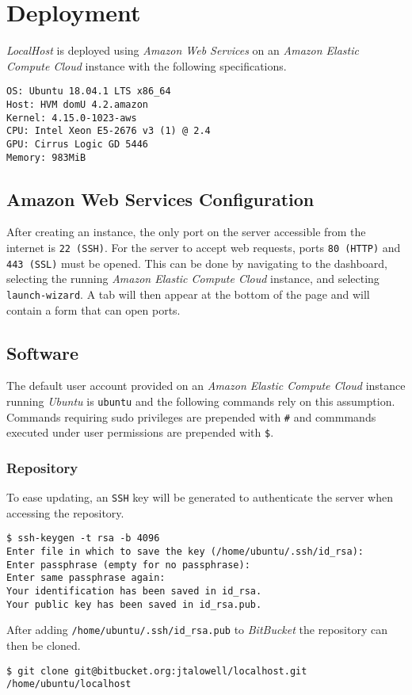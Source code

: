 \section{Deployment}

\emph{LocalHost} is deployed using \emph{Amazon Web Services} on an \emph{Amazon Elastic Compute Cloud} instance with the following specifications.
\begin{lstlisting}
OS: Ubuntu 18.04.1 LTS x86_64
Host: HVM domU 4.2.amazon
Kernel: 4.15.0-1023-aws
CPU: Intel Xeon E5-2676 v3 (1) @ 2.4
GPU: Cirrus Logic GD 5446
Memory: 983MiB
\end{lstlisting}

\subsection{Amazon Web Services Configuration}

After creating an instance, the only port on the server accessible from the internet is \lstinline{22 (SSH)}. For the server to accept web requests, ports \lstinline{80 (HTTP)} and \lstinline{443 (SSL)} must be opened. This can be done by navigating to the dashboard, selecting the running \emph{Amazon Elastic Compute Cloud} instance, and selecting \lstinline{launch-wizard}. A tab will then appear at the bottom of the page and will contain a form that can open ports.

\subsection{Software}

The default user account provided on an \emph{Amazon Elastic Compute Cloud} instance running \emph{Ubuntu} is \lstinline{ubuntu} and the following commands rely on this assumption. Commands requiring sudo privileges are prepended with \lstinline{#} and commmands executed under user permissions are prepended with \lstinline{$}.

\subsubsection{Repository}

To ease updating, an \lstinline{SSH} key will be generated to authenticate the server when accessing the repository.
\begin{lstlisting}
$ ssh-keygen -t rsa -b 4096
Enter file in which to save the key (/home/ubuntu/.ssh/id_rsa):
Enter passphrase (empty for no passphrase):
Enter same passphrase again:
Your identification has been saved in id_rsa.
Your public key has been saved in id_rsa.pub.
\end{lstlisting}
After adding \lstinline{/home/ubuntu/.ssh/id_rsa.pub} to \emph{BitBucket} the repository can then be cloned.
\begin{lstlisting}
$ git clone git@bitbucket.org:jtalowell/localhost.git /home/ubuntu/localhost
\end{lstlisting}

